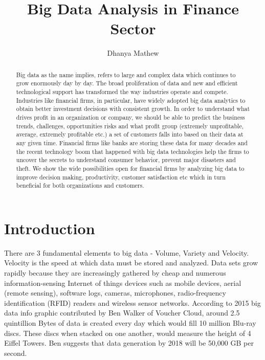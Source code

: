 \documentclass[sigconf]{acmart}
\begin{document}
\title{Big Data Analysis in Finance Sector}


\author{Dhanya Mathew}

\renewcommand{\shortauthors}{B. Trovato et al.}


\begin{abstract}

Big data as the name implies, refers to large and complex data which continues to grow enormously day by day. The broad proliferation of data and new and efficient technological support has transformed the way industries operate and compete. Industries like financial firms, in particular, have widely adopted big data analytics to obtain better investment decisions with consistent growth. In order to understand what drives profit in an organization or company, we should be able to predict the business trends, challenges, opportunities risks and what profit group (extremely unprofitable, average, extremely profitable etc.) a set of customers falls into based on their data at any given time. Financial firms like banks are storing these data for many decades and the recent technology boom that happened with big data technologies help the firms to uncover the secrets to understand consumer behavior, prevent major disasters and theft. We show the wide possibilities open for financial firms by analyzing big data to improve decision making, productivity, customer satisfaction etc which in turn beneficial for both organizations and customers.
\end{abstract}



\maketitle

\section{Introduction}

There are 3 fundamental elements to big data - Volume, Variety and Velocity. Velocity is the speed at which data must be stored and analyzed\cite{how-big-data-has-changed-finance}. Data sets grow rapidly because they are increasingly gathered by cheap and numerous information-sensing Internet of things devices such as mobile devices, aerial (remote sensing), software logs, cameras, microphones, radio-frequency identification (RFID) readers and wireless sensor networks\cite{wiki-bigdata}. According to 2015 big data info graphic contributed by Ben Walker of Voucher Cloud, around 2.5 quintillion Bytes of data is created every day which would fill 10 million Blu-ray discs. These discs when stacked on one another, would measure the height of 4 Eiffel Towers. Ben suggests that data generation by 2018 will be 50,000 GB per second\cite{how-much-data-is-created-daily}. 
\end{document}
